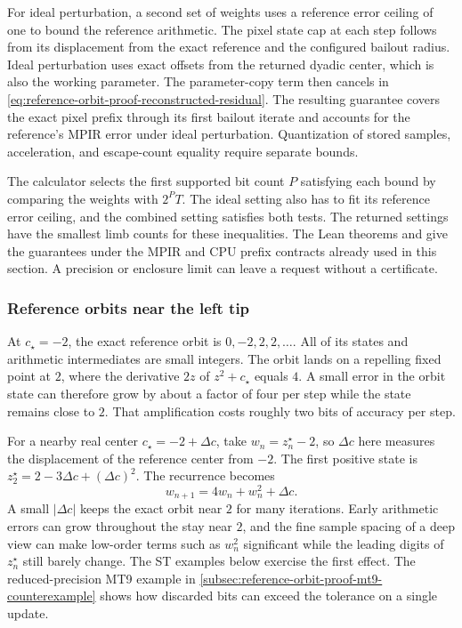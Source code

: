 For ideal perturbation, a second set of weights uses a reference
error ceiling of one to bound the reference arithmetic. The pixel
state cap at each step follows from its displacement from the exact
reference and the configured bailout radius. Ideal perturbation
uses exact offsets from the returned dyadic center, which is also
the working parameter. The parameter-copy term then cancels in
\eqref{eq:reference-orbit-proof-reconstructed-residual}. The resulting
guarantee covers the exact pixel prefix through its first bailout
iterate and accounts for the reference's MPIR error under ideal
perturbation. Quantization of stored samples, acceleration, and
escape-count equality require separate bounds.

The calculator selects the first supported bit count \(P\) satisfying
each bound by comparing the weights with \(2^P T\). The ideal setting
also has to fit its reference error ceiling, and the combined setting
satisfies both tests. The returned settings have the smallest limb
counts for these inequalities. The Lean theorems
 and
 give the guarantees under the
MPIR and CPU prefix contracts already used in this section. A precision
or enclosure limit can leave a request without a certificate.

\subsubsection{Reference orbits near the left tip}
\label{subsec:reference-orbit-left-tip}

At \(c_\star=-2\), the exact reference orbit is
\(0,-2,2,2,\ldots\). All of its states and arithmetic intermediates are
small integers. The orbit lands on a repelling fixed point at \(2\),
where the derivative \(2z\) of \(z^2+c_\star\) equals \(4\).
A small error in the orbit state can therefore grow by about a
factor of four per step while the state remains close to \(2\).
That amplification costs roughly two bits of accuracy per step.

For a nearby real center \(c_\star=-2+\Delta c\), take
\(w_n=z_n^\star-2\), so \(\Delta c\) here measures the displacement of
the reference center from \(-2\). The first positive state is
\(z_2^\star=2-3\Delta c+(\Delta c)^2\). The recurrence becomes
\begin{equation}
  w_{n+1}=4w_n+w_n^2+\Delta c.
  \label{eq:reference-orbit-left-tip}
\end{equation}
A small \(|\Delta c|\) keeps the exact orbit near \(2\) for many
iterations. Early arithmetic errors can grow throughout the stay near
\(2\), and the fine sample spacing of a deep view can make low-order
terms such as \(w_n^2\) significant while the leading digits of
\(z_n^\star\) still barely change. The ST examples below exercise the
first effect. The reduced-precision MT9 example in
\cref{subsec:reference-orbit-proof-mt9-counterexample} shows how
discarded bits can exceed the tolerance on a single update.

